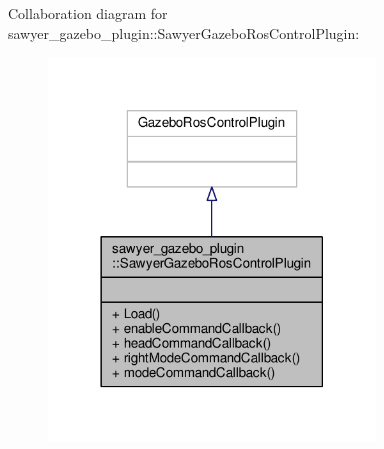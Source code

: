Collaboration diagram for sawyer\-\_\-gazebo\-\_\-plugin\-:\-:Sawyer\-Gazebo\-Ros\-Control\-Plugin\-:
\nopagebreak
\begin{figure}[H]
\begin{center}
\leavevmode
\includegraphics[width=246pt]{classsawyer__gazebo__plugin_1_1_sawyer_gazebo_ros_control_plugin__coll__graph}
\end{center}
\end{figure}
